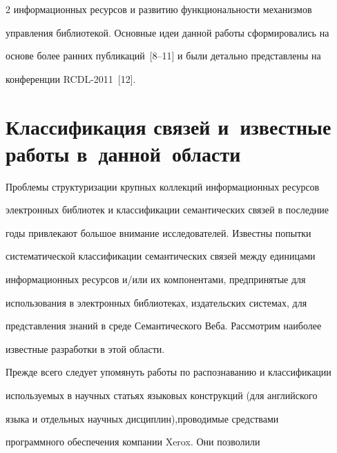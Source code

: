 \begin{multicols}{2}
информационных ресурсов и развитию функциональности механизмов 


управления библиотекой. Основные идеи данной работы сформировались на 


основе более ранних публикаций~[8--11] и были детально представлены на 


конференции RCDL-2011~[12]. 





\vspace*{-6pt}





\section{Классификация связей и~известные работы в~данной~области}





\vspace*{-2pt}





  Проблемы структуризации крупных коллекций информационных ресурсов 


электронных биб\-лио\-тек и классификации семантических связей в послед\-ние 


годы привлекают большое внимание исследователей. Известны попытки 


систематической классификации семантических связей между единицами 


информационных ресурсов и/или их компонентами, предпринятые для 


использования в электронных библиотеках, издательских системах, для 


представления знаний в среде Семантического Веба. Рассмотрим наиболее 


известные разработки в этой области.


  


  Прежде всего следует упомянуть работы по распознаванию и классификации 


используемых в научных статьях языковых конструкций (для английского 


языка и отдельных научных дисциплин),\linebreak проводимые средствами 


программного обеспечения компании {Xerox}. Они позволили 



\end{multicols}
